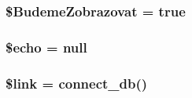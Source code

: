 \subsubsection{\setlength{\rightskip}{0pt plus 5cm}\$BudemeZobrazovat = true}\label{add__user_8php_7257dc22059027fb436043d05c4adc71}


\subsubsection{\setlength{\rightskip}{0pt plus 5cm}\$echo = null}\label{add__user_8php_76dbdd763137ce9b516dc94d3a16fe60}


\subsubsection{\setlength{\rightskip}{0pt plus 5cm}\$link = connect\_\-db()}\label{add__user_8php_5d346e31b75d916e3bac9cb193bfc97f}


